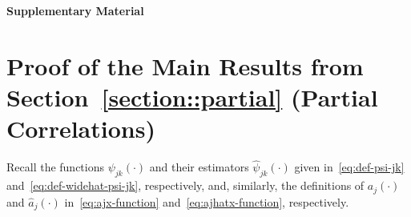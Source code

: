 \documentclass[11pt]{article}
\begin{document}


\newpage
\begin{appendices}
\begin{center}
{\Large {\bf Supplementary Material}}
\end{center}

\section{Proof of the Main Results from Section~\ref{section::partial} (Partial Correlations)}
\label{appendix:main.partial} 


Recall the functions $\psi_{jk}(\cdot)$ and their estimators $\widehat{\psi}_{jk}(\cdot)$ given in~\eqref{eq:def-psi-jk} and~\eqref{eq:def-widehat-psi-jk}, respectively, and, similarly, the definitions of $a_j(\cdot)$ and $\widehat{a}_j(\cdot)$  in~\eqref{eq:ajx-function} and~\eqref{eq:ajhatx-function}, respectively.


\end{appendices}
\end{document}
